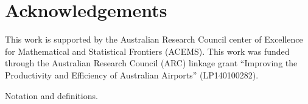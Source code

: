 \documentclass[article]{jss}
\begin{document}
\section*{Acknowledgements}

This work is supported by the Australian Research Council center of Excellence for Mathematical and Statistical Frontiers (ACEMS). This work was funded through the Australian Research Council (ARC) linkage grant ``Improving the Productivity and Efficiency of Australian Airports” (LP140100282).



\begin{table}
\resizebox{0.9\textwidth}{!}{}
\caption{Notation and definitions.}
\end{table}
\end{document}

